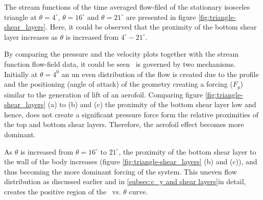  


The stream functions of the time averaged flow-filed of the stationary isosceles triangle at  $\theta=4^{\circ}$, $\theta=16^{\circ}$ and $\theta=21^{\circ}$ are presented in figure \ref{fig:triangle-shear_layers}. Here, it could be observed that the proximity of the bottom shear layer increases as $\theta$ is increased from $4^{\circ}-21^{\circ}$.

By comparing the pressure and the velocity plots together with the stream function flow-field data, it could be seen \cy\ is governed by two mechanisms. Initially at $\theta= 4^{0}$ an un even distribution of the flow is created due to the profile and the positioning (angle of attack) of the geometry creating a forcing ($F_{y}$) similar to the generation of lift of an aerofoil. Comparing figure \ref{fig:triangle-shear_layers} (a) to (b) and (c) the proximity of the bottom shear layer low and hence, does not create a significant pressure force form the relative proximities of the top and bottom shear layers. Therefore, the aerofoil effect becomes more dominant.  

As $\theta$ is increased from $\theta=16^{\circ}$ to $21^{\circ}$, the proximity of the bottom shear layer to the wall of the body increases (figure \ref{fig:triangle-shear_layers} (b) and (c)), and thus becoming the more dominant forcing of the system. This uneven flow distribution as discussed earlier and in \ref{subsec:c_y and shear layers}in detail, creates the positive region of the \cy\ vs. $\theta$ curve.



    
 
 
 
 
 



